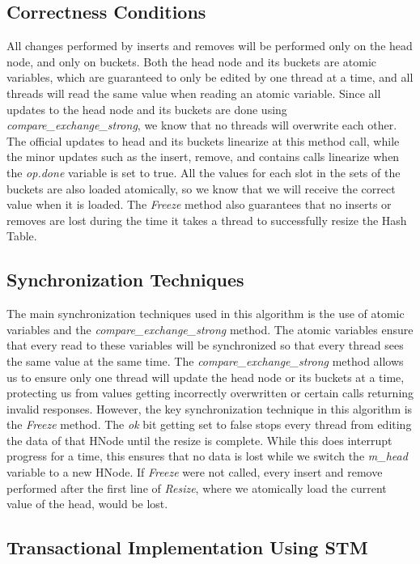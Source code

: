 \documentclass[11pt]{article} %
\begin{document}
\subsection{Correctness Conditions}

All changes performed by inserts and removes will be performed only on the head node, and only on buckets. Both the head node and its buckets are atomic variables, which are guaranteed to only be edited by one thread at a time, and all threads will read the same value when reading an atomic variable. Since all updates to the head node and its buckets are done using  \textit{compare\_exchange\_strong}, we know that no threads will overwrite each other. The official updates to head and its buckets linearize at this method call, while the minor updates such as the insert, remove, and contains calls linearize when the \textit{op.done} variable is set to true. All the values for each slot in the sets of the buckets are also loaded atomically, so we know that we will receive the correct value when it is loaded. The \textit{Freeze} method also guarantees that no inserts or removes are lost during the time it takes a thread to successfully resize the Hash Table.


\subsection{Synchronization Techniques}

The main synchronization techniques used in this algorithm is the use of atomic variables and the \textit{compare\_exchange\_strong} method. The atomic variables ensure that every read to these variables will be synchronized so that every thread sees the same value at the same time. The \textit{compare\_exchange\_strong} method allows us to ensure only one thread will update the head node or its buckets at a time, protecting us from values getting incorrectly overwritten or certain calls returning invalid responses. However, the key synchronization technique in this algorithm is the \textit{Freeze} method. The \textit{ok} bit getting set to false stops every thread from editing the data of that HNode until the resize is complete. While this does interrupt progress for a time, this ensures that no data is lost while we switch the \textit{m\_head} variable to a new HNode. If \textit{Freeze} were not called, every insert and remove performed after the first line of \textit{Resize}, where we atomically load the current value of the head, would be lost.

\subsection{Transactional Implementation Using STM}
\end{document}
